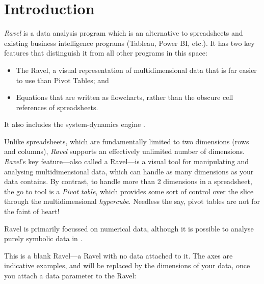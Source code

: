 
\chapter{Introduction}

\label{Introduction}\emph{Ravel} is a data analysis program which
is an alternative to spreadsheets and existing business intelligence
programs (Tableau, Power BI, etc.). It has two key features that distinguish
it from all other programs in this space: 
\begin{itemize}
\item The Ravel, a visual representation of multidimensional data that is
far easier to use than Pivot Tables; and
\item Equations that are written as flowcharts, rather than the obscure
cell references of spreadsheets.
\end{itemize}
It also includes the system-dynamics engine .

Unlike spreadsheets, which are fundamentally limited to two dimensions
(rows and columns), \emph{Ravel} supports an effectively unlimited
number of dimensions. \emph{Ravel}'s key feature---also called a
Ravel---is a visual tool for manipulating and analysing multidimensional
data, which can handle as many dimensions as your data contains. By
contrast, to handle more than 2 dimensions in a spreadsheet, the go to
tool is a {\em Pivot table}, which provides some sort of control over
the slice through the multidimensional {\em hypercube}. Needless the
say, pivot tables are not for the faint of heart!

Ravel is primarily focussed on numerical data, although it is possible
to analyse purely symbolic data in .

This is a blank Ravel---a Ravel with no data attached to it. The
axes are indicative examples, and will be replaced by the dimensions
of your data, once you attach a data parameter to the Ravel:

